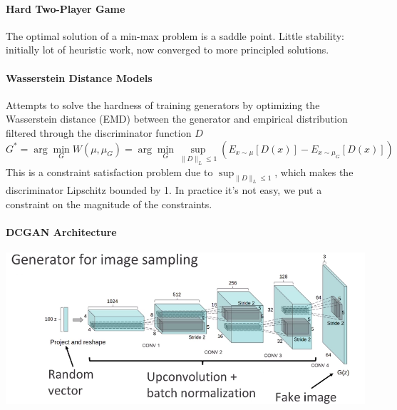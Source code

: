 \documentclass[10pt]{report}
\begin{document}
\paragraph{Hard Two-Player Game} The optimal solution of a min-max problem is a saddle point. Little stability: initially lot of heuristic work, now converged to more principled solutions.
\paragraph{Wasserstein Distance Models} Attempts to solve the hardness of training generators by optimizing the Wasserstein distance (EMD) between the generator and empirical distribution filtered through the discriminator function $D$
$$G^* = \arg\min_G W(\mu,\mu_G) = \arg\min_G\sup_{\|D\|_L\leq 1}(E_{x\sim\mu}[D(x)]-E_{x\sim\mu_G}[D(x)])$$
This is a constraint satisfaction problem due to $\sup_{\|D\|_L\leq 1}$, which makes the discriminator Lipschitz bounded by 1. In practice it's not easy, we put a constraint on the magnitude of the constraints.
\paragraph{DCGAN Architecture}
\begin{center}
	\includegraphics[scale=0.5]{149.png}
\end{center}
\end{document}
